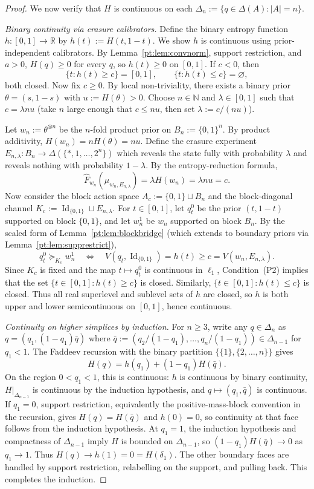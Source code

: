 \documentclass[11pt,a4paper]{article}
\theoremstyle{definition}
\newcommand{\Id}{\operatorname{Id}}
\newcommand{\R}{\mathbb R}
\newcommand{\1}{\mathbf 1}
\begin{document}
\begin{proof}
We now verify that $H$ is continuous on each $\Delta_n:=\{q\in\Delta(A):|A|=n\}$.

\emph{Binary continuity via erasure calibrators.}
Define the binary entropy function $h:[0,1]\to\R$ by $h(t):=H(t,1-t)$.  We show $h$ is continuous using
prior-independent calibrators.  By Lemma~\ref{pt:lem:convnorm}, support restriction, and $a>0$, $H(q)\ge0$ for every $q$,
so $h(t)\ge0$ on $[0,1]$.  If $c<0$, then
\[
\{t:h(t)\ge c\}=[0,1],
\qquad
\{t:h(t)\le c\}=\varnothing,
\]
both closed.  Now fix $c\ge0$.  By local non-triviality, there exists a binary prior $\theta=(s,1-s)$ with
$u:=H(\theta)>0$.  Choose $n\in\mathbb{N}$ and $\lambda\in[0,1]$ such that $c=\lambda nu$
(take $n$ large enough that $c\le nu$, then set $\lambda:=c/(nu)$).

Let $w_n:=\theta^{\otimes n}$ be the $n$-fold product prior on $B_n:=\{0,1\}^n$.  By product additivity,
$H(w_n)=nH(\theta)=nu$.  Define the erasure experiment $E_{n,\lambda}:B_n\to\Delta(\{*,1,\dots,2^n\})$ which
reveals the state fully with probability $\lambda$ and reveals nothing with probability $1-\lambda$.  By the
entropy-reduction formula,
\[
\widehat F_{w_n}(\mu_{w_n,E_{n,\lambda}})=\lambda H(w_n)=\lambda nu=c.
\]
Now consider the block action space $A_c:=\{0,1\}\sqcup B_n$ and the block-diagonal channel
$K_c:=\Id_{\{0,1\}}\sqcup E_{n,\lambda}$.  For $t\in[0,1]$, let $q_t^0$ be the prior $(t,1-t)$ supported on
block $\{0,1\}$, and let $w_n^1$ be $w_n$ supported on block $B_n$.  By the scaled form of
Lemma~\ref{pt:lem:blockbridge} (which extends to boundary priors via Lemma~\ref{pt:lem:supprestrict}),
\[
q_t^0\succeq_{K_c}w_n^1\quad\Longleftrightarrow\quad V(q_t,\Id_{\{0,1\}})=h(t)\ge c=V(w_n,E_{n,\lambda}).
\]
Since $K_c$ is fixed and the map $t\mapsto q_t^0$ is continuous in $\ell_1$, Condition~\textup{(P2)} implies that the
set $\{t\in[0,1]:h(t)\ge c\}$ is closed.  Similarly, $\{t\in[0,1]:h(t)\le c\}$ is closed.  Thus all real superlevel and
sublevel sets of $h$ are closed, so $h$ is both upper and lower semicontinuous on $[0,1]$, hence continuous.

\emph{Continuity on higher simplices by induction.}
For $n\ge3$, write any $q\in\Delta_n$ as $q=(q_1,(1-q_1)\bar q)$ where
$\bar q:=(q_2/(1-q_1),\dots,q_n/(1-q_1))\in\Delta_{n-1}$ for $q_1<1$.  The Faddeev recursion with the
binary partition $\{\{1\},\{2,\dots,n\}\}$ gives
\[
H(q)=h(q_1)+(1-q_1)H(\bar q).
\]
On the region $0<q_1<1$, this is continuous: $h$ is continuous by binary continuity, $H|_{\Delta_{n-1}}$ is
continuous by the induction hypothesis, and $q\mapsto(q_1,\bar q)$ is continuous.  If $q_1=0$, support restriction,
equivalently the positive-mass-block convention in the recursion, gives $H(q)=H(\bar q)$ and $h(0)=0$,
so continuity at that face follows from the induction hypothesis.  At $q_1=1$, the induction hypothesis and compactness
of $\Delta_{n-1}$ imply $H$ is bounded on $\Delta_{n-1}$, so
$(1-q_1)H(\bar q)\to0$ as $q_1\to1$.  Thus $H(q)\to h(1)=0=H(\delta_1)$.  The other boundary faces are handled
by support restriction, relabelling on the support, and pulling back.  This completes the induction.


\end{proof}
\end{document}
